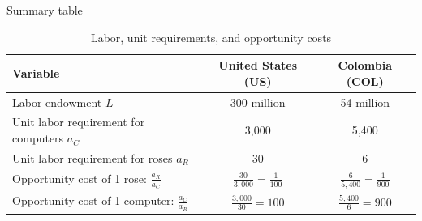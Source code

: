 \documentclass[notes,11pt, aspectratio=169, xcolor=table]{beamer}
\begin{document}
\begin{frame}{Summary table}
\begin{table}[htbp]
\centering
\begin{tabular}{lcc}
\toprule
\textbf{Variable} & \textbf{United States (US)} & \textbf{Colombia (COL)} \\
\midrule
Labor endowment $L$ & 300 million & 54 million \\
Unit labor requirement for computers $a_C$ & 3{,}000 & 5{,}400 \\
Unit labor requirement for roses $a_R$ & 30 & 6 \\
\midrule
Opportunity cost of 1 rose: $\frac{a_R}{a_C}$ & $\frac{30}{3{,}000} = \frac{1}{100}$ & $\frac{6}{5{,}400} = \frac{1}{900}$ \\
Opportunity cost of 1 computer: $\frac{a_C}{a_R}$ & $\frac{3{,}000}{30} = 100$ & $\frac{5{,}400}{6} = 900$ \\
\bottomrule
\end{tabular}
\caption{Labor, unit requirements, and opportunity costs}
\end{table}
    
\end{frame}
\end{document}
